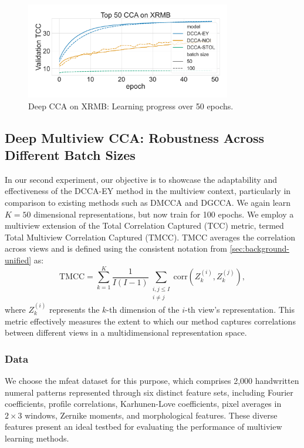 \begin{figure}
    \centering
    \includegraphics[width=0.8\textwidth]{figures/DCCA/XRMB_allbatchsizes_pcc}
    \caption{Deep CCA on XRMB: Learning progress over 50 epochs.}
    \label{fig:lr_xrmb}
\end{figure}

\subsection{Deep Multiview CCA: Robustness Across Different Batch Sizes}
In our second experiment, our objective is to showcase the adaptability and effectiveness of the DCCA-EY method in the multiview context, particularly in comparison to existing methods such as DMCCA and DGCCA.
We again learn $K=50$ dimensional representations, but now train for 100 epochs.
We employ a multiview extension of the Total Correlation Captured (TCC) metric, termed Total Multiview Correlation Captured (TMCC). TMCC averages the correlation across views and is defined using the consistent notation from \cref{sec:background-unified} as:
\[
    \text{TMCC} = \sum_{k=1}^{K} \frac{1}{I(I-1)} \sum_{\substack{i,j \leq I \\ i \neq j}} \text{corr}(Z_k^{(i)}, Z_k^{(j)}),
\]
where \( Z_k^{(i)} \) represents the \( k \)-th dimension of the \( i \)-th view's representation.
This metric effectively measures the extent to which our method captures correlations between different views in a multidimensional representation space.

\subsubsection{Data} We choose the mfeat dataset for this purpose, which comprises 2,000 handwritten numeral patterns represented through six distinct feature sets, including Fourier coefficients, profile correlations, Karhunen-Love coefficients, pixel averages in \(2 \times 3\) windows, Zernike moments, and morphological features.
These diverse features present an ideal testbed for evaluating the performance of multiview learning methods.

